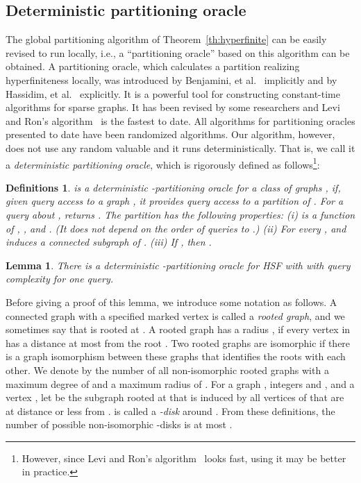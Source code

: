 \documentclass[11pt]{article}
\newtheorem{df}[thm]{Definitions}
\newtheorem{lm}[thm]{Lemma}
\begin{document}
\subsection{Deterministic partitioning oracle}


The global partitioning algorithm of Theorem~\ref{th:hyperfinite} 
can be easily revised to run locally, 
i.e., a ``partitioning oracle'' based on this algorithm can be obtained. 
A partitioning oracle, which calculates a partition realizing hyperfiniteness locally, 
was introduced by Benjamini, et al.~\cite{BSS_MC-testable_STOC08} 
implicitly and by Hassidim, et al.~\cite{HKNO_LocalPartition_FOCS09} explicitly. 
It is a powerful tool for constructing constant-time algorithms 
for sparse graphs. It has been revised by some researchers and 
Levi and Ron's algorithm~\cite{Levi-Ron_PO_ICALP13} is the fastest to date. 
All algorithms for partitioning oracles presented to date have been randomized algorithms. 
Our algorithm, however, does not use any random valuable 
and it runs deterministically. 
That is, we call it a {\em deterministic partitioning oracle}, 
which is rigorously defined as follows\footnote{
However, since Levi and Ron's algorithm~\cite{Levi-Ron_PO_ICALP13} 
looks fast, using it may be better in practice. 
}: 

\begin{df}
 is a deterministic -partitioning oracle for 
a class of graphs , if, 
given query access to a graph , 
it provides query access to a partition  of . 
For a query about , 
 returns 
. 
The partition has the following properties: 
(i)  is a function of , , and . 
(It does not depend on the order of queries to .)
(ii) For every , 
 and 
 induces a connected subgraph of . 
(iii) If , then 
. 
\end{df}





\begin{lm}\label{lm:PO}
There is a deterministic -partitioning oracle  for HSF with  with query complexity  for one query. 
\end{lm}


Before giving a proof of this lemma, we introduce some notation as follows. 
A connected graph  with a specified marked vertex  is called a
{\em rooted graph}, and we sometimes say that  is rooted at .  
A rooted graph  has a radius , 
if every vertex in  has a distance at most  from the root . 
Two rooted graphs are isomorphic if there is a graph isomorphism between these graphs 
that identifies the roots with each other. 
We denote by  the number of all non-isomorphic 
rooted graphs with a maximum degree of  and a maximum
radius of . 
For a graph , integers  and , 
and a vertex , let  be the subgraph  
rooted at  that is induced by all vertices 
of  that are at distance  or less from . 
 is called a {\em -disk} around .  
From these definitions, the number of possible non-isomorphic 
-disks is at most . \\
\end{document}
